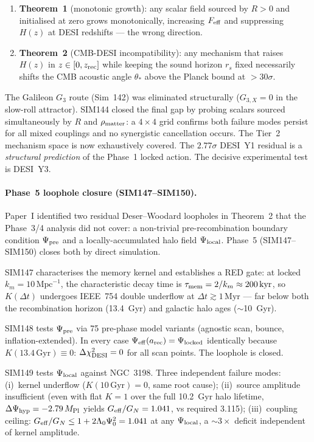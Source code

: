 \documentclass[12pt,a4paper]{article}
\begin{document}
\begin{enumerate}
  \item \textbf{Theorem~1} (monotonic growth): any scalar field sourced by $R>0$
    and initialised at zero grows monotonically, increasing $F_{\rm eff}$ and
    suppressing $H(z)$ at DESI redshifts --- the wrong direction.
  \item \textbf{Theorem~2} (CMB-DESI incompatibility): any mechanism that raises
    $H(z)$ in $z\in[0,z_{\rm rec}]$ while keeping the sound horizon $r_s$ fixed
    necessarily shifts the CMB acoustic angle $\theta_*$ above the Planck bound
    at $>30\sigma$.
\end{enumerate}

The Galileon $G_3$ route (Sim~142) was eliminated structurally ($G_{3,X}=0$ in
the slow-roll attractor). SIM144 closed the final gap by probing scalars sourced
simultaneously by $R$ and $\rho_{\rm matter}$: a $4\times4$ grid confirms both
failure modes persist for all mixed couplings and no synergistic cancellation
occurs.  The Tier~2 mechanism space is now exhaustively covered.
The $2.77\sigma$ DESI~Y1 residual is a \emph{structural prediction} of the
Phase~1 locked action.  The decisive experimental test is DESI~Y3.

\paragraph{Phase~5 loophole closure (SIM147--SIM150).}
Paper~I identified two residual Deser--Woodard loopholes in Theorem~2 that the
Phase~3/4 analysis did not cover: a non-trivial pre-recombination boundary
condition $\Psi_{\rm pre}$ and a locally-accumulated halo field $\Psi_{\rm
local}$.  Phase~5 (SIM147--SIM150) closes both by direct simulation.

SIM147 characterises the memory kernel and establishes a RED gate: at locked
$k_m=10\,\mathrm{Mpc}^{-1}$, the characteristic decay time is
$\tau_{\rm mem}=2/k_m\approx200\,\mathrm{kyr}$, so $K(\Delta t)$ undergoes
IEEE~754 double underflow at $\Delta t\gtrsim1\,\mathrm{Myr}$ --- far below
both the recombination horizon (13.4~Gyr) and galactic halo ages ($\sim$10~Gyr).

SIM148 tests $\Psi_{\rm pre}$ via 75 pre-phase model variants (agnostic scan,
bounce, inflation-extended).  In every case $\Psi_{\rm eff}(a_{\rm rec})=
\Psi_{\rm locked}$ identically because $K(13.4\,\mathrm{Gyr})\equiv0$:
$\Delta\chi^2_{\rm DESI}=0$ for all scan points.  The loophole is closed.

SIM149 tests $\Psi_{\rm local}$ against NGC~3198.  Three independent failure
modes: (i)~kernel underflow ($K(10\,\mathrm{Gyr})=0$, same root cause);
(ii)~source amplitude insufficient (even with flat $K=1$ over the full
10.2~Gyr halo lifetime, $\Delta\Psi_{\rm hyp}=-2.79\,M_{\rm Pl}$ yields
$G_{\rm eff}/G_N=1.041$, vs required 3.115); (iii)~coupling ceiling:
$G_{\rm eff}/G_N\leq1+2\Lambda_0\Psi_0^2=1.041$ at any $\Psi_{\rm local}$,
a $\sim3\times$ deficit independent of kernel amplitude.
\end{document}
